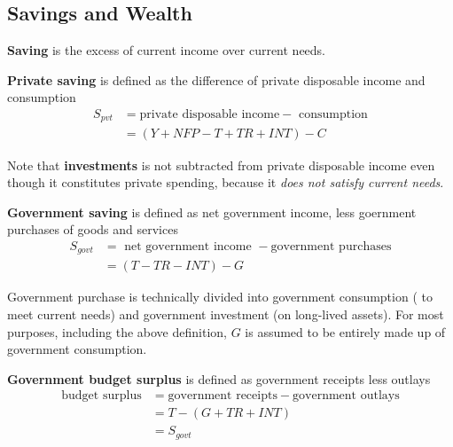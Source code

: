 \subsection{Savings and Wealth}

\textbf{Saving} is the excess of current income over current needs. 

\begin{definition}
    \textbf{Private saving} is defined as the difference of private disposable income and consumption 
    \begin{align*}
        S_{pvt} &= \text{private disposable income} - \text{ consumption} \\
        &= (Y + NFP - T + TR + INT) - C
    \end{align*}
\end{definition}

\begin{remarks}
    Note that \textbf{investments} is not subtracted from private disposable income even though it constitutes private spending, because it \textit{does not satisfy current needs}.
\end{remarks}

\begin{definition}
    \textbf{Government saving} is defined as net government income, less goernment purchases of goods and services 
    \begin{align*}
        S_{govt} &= \text{ net government income } - \text{government purchases} \\
        &= (T - TR - INT) - G
    \end{align*}
\end{definition}

\begin{remark}
    Government purchase is technically divided into government consumption ( to meet current needs) and government investment (on long-lived assets). For most purposes, including the above definition, $G$ is assumed to be entirely made up of government consumption.
\end{remark}

\begin{remark}
    \textbf{Government budget surplus} is defined as government receipts less outlays 
    \begin{align*}
        \text{budget surplus} &= \text{government receipts} - \text{government outlays} \\
        &= T - (G + TR + INT) \\
        &= S_{govt}
    \end{align*}
\end{remark}

